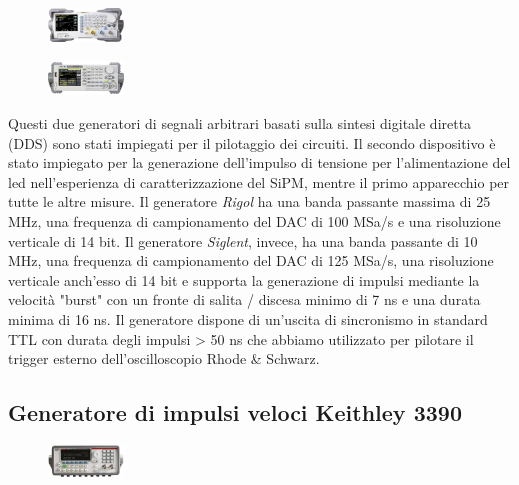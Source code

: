\documentclass[journal]{IEEEtran}
\begin{document}
\begin{figure}[h!]
  \centering
  \includegraphics[width=0.18\textwidth]{lab-reports/Schematics-and-graphics/RIGOL Gen.png}
\end{figure}

\begin{figure}[h!]
  \centering
  \includegraphics[width=0.18\textwidth]{lab-reports/Schematics-and-graphics/SIGLENT Gen.png}
\end{figure}

Questi due generatori di segnali arbitrari basati sulla sintesi digitale diretta (DDS) sono stati impiegati per il pilotaggio dei circuiti. Il secondo dispositivo è stato impiegato per la generazione dell'impulso di tensione per l'alimentazione del led nell'esperienza di caratterizzazione del SiPM, mentre il primo apparecchio per tutte le altre misure. Il generatore \textit{Rigol} ha una banda passante massima di 25 MHz, una frequenza di campionamento del DAC di 100 MSa/s e una risoluzione verticale di 14 bit. Il generatore \textit{Siglent}, invece, ha una banda passante di 10 MHz, una frequenza di campionamento del DAC di 125 MSa/s, una risoluzione verticale anch'esso di 14 bit e supporta la generazione di impulsi mediante la velocità "burst" con un fronte di salita / discesa minimo di 7 ns e una durata minima di 16 ns. Il generatore dispone di un'uscita di sincronismo in standard TTL con durata degli impulsi > 50 ns che abbiamo utilizzato per pilotare il trigger esterno dell'oscilloscopio Rhode & Schwarz.

\subsection{\textbf{Generatore di impulsi veloci Keithley 3390}}

\begin{figure}[h!]
  \centering
  \includegraphics[width=0.18\textwidth]{lab-reports/Schematics-and-graphics/KEIT Gen.png}
\end{figure}
\end{document}
